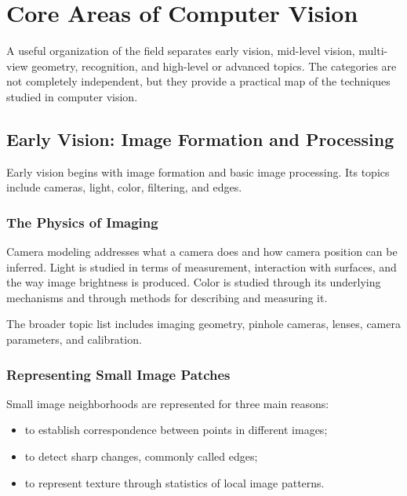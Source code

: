 \documentclass[11pt,a4paper,oneside]{report}
\begin{document}
\chapter{Core Areas of Computer Vision}

A useful organization of the field separates early vision, mid-level vision, multi-view geometry, recognition, and high-level or advanced topics. The categories are not completely independent, but they provide a practical map of the techniques studied in computer vision.

\section{Early Vision: Image Formation and Processing}

Early vision begins with image formation and basic image processing. Its topics include cameras, light, color, filtering, and edges.

\subsection{The Physics of Imaging}

Camera modeling addresses what a camera does and how camera position can be inferred. Light is studied in terms of measurement, interaction with surfaces, and the way image brightness is produced. Color is studied through its underlying mechanisms and through methods for describing and measuring it.

The broader topic list includes imaging geometry, pinhole cameras, lenses, camera parameters, and calibration.

\subsection{Representing Small Image Patches}

Small image neighborhoods are represented for three main reasons:

\begin{itemize}
  \item to establish correspondence between points in different images;
  \item to detect sharp changes, commonly called edges;
  \item to represent texture through statistics of local image patterns.
\end{itemize}
\end{document}
